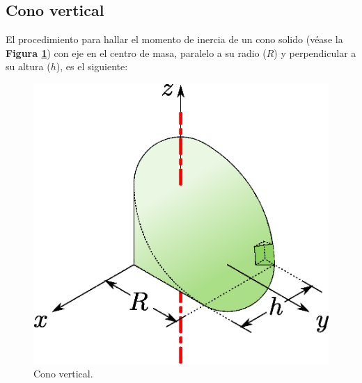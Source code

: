 \subsection{Cono vertical}
El procedimiento para hallar el momento de inercia de un cono solido
(véase la \textbf{Figura \ref{figura20}}) con eje en el centro de masa,
paralelo a su radio ($R$) y perpendicular a su altura ($h$), es el siguiente:

\begin{figure}
\centering
\includegraphics[scale=0.5]{resources/f20.eps}
\caption{Cono vertical.}
\label{figura20}
\end{figure}

